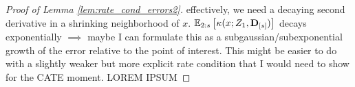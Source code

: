 \begin{proof}[Proof of Lemma \ref{lem:rate_cond_errors2}]
    {\color{blue} effectively, we need a decaying second derivative in a shrinking neighborhood of $x$.
    $\mathbb{E}_{2:s}\left[\kappa(x; Z_{1}, \mathbf{D}_{[s]})\right]$ decays exponentially $\implies$ maybe I can formulate this as a subgaussian/subexponential growth of the error relative to the point of interest.
    This might be easier to do with a slightly weaker but more explicit rate condition that I would need to show for the CATE moment.}
    {\color{red} LOREM IPSUM}
\end{proof}